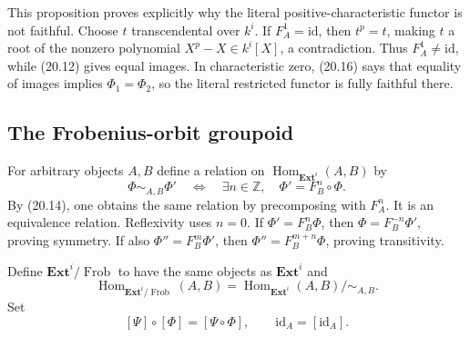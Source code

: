 \documentclass[11pt,oneside]{article}
\theoremstyle{definition}
\theoremstyle{remark}
\newcommand{\Frob}{\operatorname{Frob}}
\begin{document}
This proposition proves explicitly why the literal positive-characteristic functor is not
faithful.  Choose $t$ transcendental over $k^i$.  If $F_A^1=\mathrm{id}$, then
$t^p=t$, making $t$ a root of the nonzero polynomial $X^p-X\in k^i[X]$, a contradiction.
Thus $F_A^1\neq\mathrm{id}$, while (20.12) gives equal images.  In characteristic zero,
(20.16) says that equality of images implies $\Phi_1=\Phi_2$, so the literal restricted
functor is fully faithful there.

\subsection{The Frobenius-orbit groupoid}

For arbitrary objects $A,B$ define a relation on
$\operatorname{Hom}_{\mathbf{Ext}^{i}}(A,B)$ by
\[
 \Phi\sim_{A,B}\Phi'
 \quad\Longleftrightarrow\quad
 \exists n\in\mathbb Z,\quad \Phi'=F_B^n\circ\Phi.            \tag{20.17}
\]
By (20.14), one obtains the same relation by precomposing with $F_A^n$.
It is an equivalence relation.  Reflexivity uses $n=0$.  If
$\Phi'=F_B^n\Phi$, then $\Phi=F_B^{-n}\Phi'$, proving symmetry.  If also
$\Phi''=F_B^m\Phi'$, then
$\Phi''=F_B^{m+n}\Phi$, proving transitivity.

Define $\mathbf{Ext}^{i}/\Frob$ to have the same objects as $\mathbf{Ext}^{i}$ and
\[
 \operatorname{Hom}_{\mathbf{Ext}^{i}/\Frob}(A,B)
 =\operatorname{Hom}_{\mathbf{Ext}^{i}}(A,B)/{\sim_{A,B}}.
                                                                    \tag{20.18}
\]
Set
\[
 [\Psi]\circ[\Phi]=[\Psi\circ\Phi],\qquad
 \mathrm{id}_A=[\mathrm{id}_A].                                \tag{20.19}
\]
\end{document}
